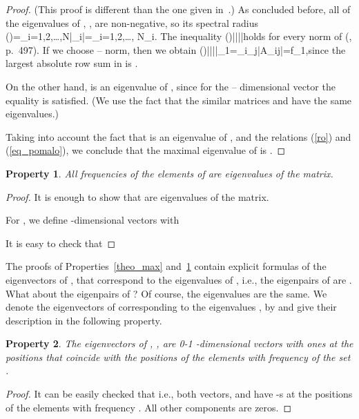 \documentclass[technote, a4paper, onecolumn]{IEEEtran}  \newcommand{\avtor}{Aleksandar Simevski}
\newtheorem{property}{Property}
\begin{document}
\begin{proof}\label{proof_max}
(This proof is different than the one given in~\cite{Simevski2012a}.) As concluded before, all of the eigenvalues of , ,  are non-negative, so its spectral radius \be\label{ro}\rho()=\displaystyle\max_{i=1,2,\ldots,N}|\lambda_i|=\max_{i=1,2,\ldots, N}\lambda_i.\ee
The inequality \be\rho()\leq ||||\ee holds for every norm of  (\cite{Meyer2000}, p.~497). If we choose  -- norm, then we obtain \be\label{eq_pomalo}\rho()\leq ||||_1=\max_i\sum_j|A_{ij}|=f_{1},\ee since the largest absolute row sum in  is .

On the other hand,  is an eigenvalue of , since for the  -- dimensional  vector  the equality  is satisfied. (We use the fact that the similar matrices  and  have  the same eigenvalues.)

Taking into account the fact that  is an eigenvalue of , and the relations (\ref{ro}) and (\ref{eq_pomalo}), we conclude  that the maximal eigenvalue of  is .
\end{proof}



\medskip
\begin{property}\label{theo_fr}
All frequencies of the elements of  are eigenvalues of the  matrix.
\end{property}

\begin{proof}\label{proof_fr}
It is enough to show that  are eigenvalues of the  matrix.

For , we define -dimensional vectors  with 

It is easy to check that 
\end{proof}

The proofs of Properties~\ref{theo_max} and~\ref{theo_fr} contain
explicit  formulas of the eigenvectors of ,
that correspond to the eigenvalues of ,
i.e., the eigenpairs of  are . What about the
eigenpairs of ? Of course, the eigenvalues are the
same. We denote the eigenvectors of  corresponding to the
eigenvalues , by
 and give their description in the following property. 

\medskip
\begin{property}\label{theo_pos}
The eigenvectors of , , are 0-1 -dimensional vectors with ones at
the positions that coincide with the positions of the elements
with frequency  of the set .
\end{property}

\begin{proof}\label{proof_pos}
It can be easily checked that
 i.e., both
vectors,  and 
have -s at the positions of the elements with frequency .
All other components are zeros.
\end{proof}
\end{document}
